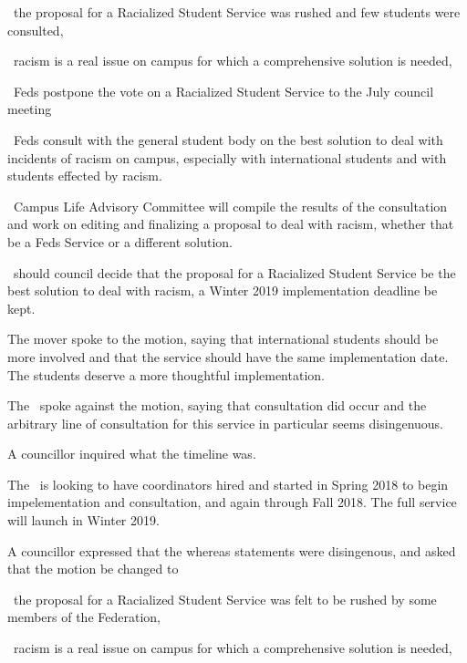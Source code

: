 \begin{motion}
    \begin{motion}
        \whereas\ the proposal for a Racialized Student Service was rushed and
        few students were consulted,

        \whereas\ racism is a real issue on campus for which a comprehensive
        solution is needed,

        \birt\ Feds postpone the vote on a Racialized Student Service to the
        July council meeting

        \bifrt\ Feds consult with the general student body on the best solution
        to deal with incidents of racism on campus, especially with
        international students and with students effected by racism.

        \bifrt\ Campus Life Advisory Committee will compile the results of the
        consultation and work on editing and finalizing a proposal to deal with
        racism, whether that be a Feds Service or a different solution.

        \bifrt\ should council decide that the proposal for a Racialized
        Student Service be the best solution to deal with racism, a Winter 2019
        implementation deadline be kept.

        \movers{\alexander}{\harsh}


        The mover spoke to the motion, saying that international students
        should be more involved and that the service should have the same
        implementation date. The students deserve a more thoughtful 
        implementation.

        The \pres\ spoke against the motion, saying that consultation did occur
        and the arbitrary line of consultation for this service in particular
        seems disingenuous.

        A councillor inquired what the timeline was.

        The \vpi\ is looking to have coordinators hired and started in Spring 
        2018 to begin impelementation and consultation, and again through
        Fall 2018. The full service will launch in Winter 2019.

        A councillor expressed that the whereas statements were disingenous,
        and asked that the motion be changed to
        \begin{motion}
            \whereas\ the proposal for a Racialized Student Service was felt to
            be rushed by some members of the Federation,

            \whereas\ racism is a real issue on campus for which a comprehensive
            solution is needed,


\end{motion}
\end{motion}
\end{motion}
